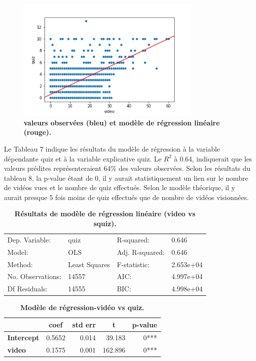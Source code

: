 \documentclass[12pt, a4paper, titlepage, table]{article}
\begin{document}
\begin{figure}[H]
	\centering
	\includegraphics[width=0.8\textwidth]{../../graph/scatter2_regression.png}
	\caption{\textbf{valeurs observées (bleu) et modèle de régression linéaire (rouge).}}
\end{figure}

Le Tableau 7 indique les résultats du modèle de régression à la variable dépendante quiz et à la variable explicative quiz. Le $R^2$ à 0.64, indiquerait que les valeurs prédites représenteraient 64\% des valeurs observées. 
Selon les résultats du tableau 8, la p-value étant de 0, il y aurait statistiquement un lien sur le nombre de vidéos vues et le nombre de quiz effectués. Selon le modèle théorique, il y aurait presque 5 fois moins de quiz effectués que de nombre de vidéos visionnées.

\begin{table}[H]
	\centering
	\fontsize{12}{20}\selectfont
	\begin{tabular}{|ll|ll|}
		\hline
			Dep. Variable:&	quiz&	R-squared:&	0.646\\
			Model:&	OLS&	Adj. R-squared:&	0.646\\
			Method:&	Least Squares&	F-statistic:&	2.653e+04\\
			No. Observations:&	14557&	AIC:&	4.997e+04\\
			Df Residuals:&	14555&	BIC:&	4.998e+04\\
		\hline
	\end{tabular}
\caption{\textbf{Résultats de modèle de régression linéaire (video vs squiz).}}
\end{table}
	
	
\begin{table}[H]
	\centering
	\fontsize{12}{20}\selectfont
	\begin{tabular}{|l|r|r|r|r|}
		\hline
			\multicolumn{1}{|c|}{\textbf{}}&
			\multicolumn{1}{c|}{\textbf{coef}}&
			\multicolumn{1}{c|}{\textbf{std err}}&
			\multicolumn{1}{c|}{\textbf{t}}&
			\multicolumn{1}{c|}{\textbf{p-value}}\\	
		\hline
		\textbf{Intercept}&	0.5652&	0.014&	39.183&	0***\\
		\textbf{video}&	0.1575&	0.001&	162.896&	0***\\
		\hline
\end{tabular}
\caption{\textbf{Modèle de régression-vidéo vs quiz.}}
\end{table}
\end{document}
